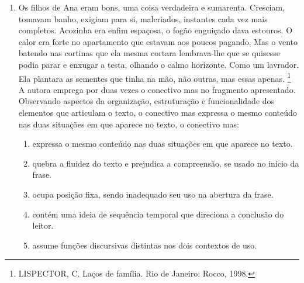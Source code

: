 \documentclass[10pt,a4paper]{article}
\begin{document}
\begin{multicols}{2}
\begin{enumerate}
	\item Os filhos de Ana eram bons, uma coisa verdadeira e sumarenta. Cresciam, tomavam banho, exigiam para si, malcriados, instantes cada vez mais completos. Acozinha era enfim espa\c{c}osa, o fog\~ao engui\c{c}ado dava estouros. O calor era forte no apartamento que estavam aos poucos pagando. Mas o vento batendo nas cortinas que ela mesma cortara lembrava-lhe que se quisesse podia parar e enxugar a testa, olhando o calmo horizonte. Como um lavrador. Ela plantara as sementes que tinha na m\~ao, n\~ao outras, mas essas apenas. \footnote{LISPECTOR, C. La\c{c}os de fam\'ilia. Rio de Janeiro: Rocco, 1998.} \\
	A autora emprega por duas vezes o conectivo mas no fragmento apresentado. Observando aspectos da organiza\c{c}\~ao, estrutura\c{c}\~ao e funcionalidade dos elementos que articulam o texto, o conectivo mas expressa o mesmo conte\'udo nas duas situa\c{c}\~oes em que aparece no texto, o conectivo mas:
		
		\begin{enumerate}
		\item expressa o mesmo conte\'udo nas duas situa\c{c}\~oes em que aparece no texto.
		\item quebra a fluidez do texto e prejudica a compreens\~ao, se usado no in\'icio da frase.
		\item ocupa posi\c{c}\~ao fixa, sendo inadequado seu uso na abertura da frase.
		\item cont\'em uma ideia de sequ\^encia temporal que direciona a conclus\~ao do leitor.
		\item assume fun\c{c}\~oes discursivas distintas nos dois contextos de uso.
		\end{enumerate}



\end{enumerate}
\end{multicols}
\end{document}
